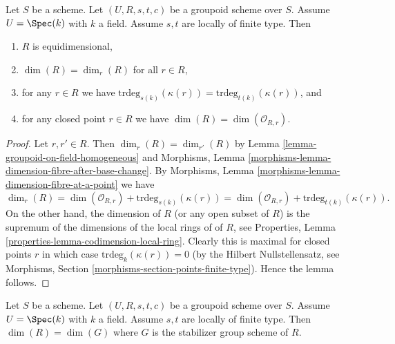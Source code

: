 \begin{lemma}
\label{lemma-groupoid-on-field-locally-finite-type-dimension}
Let $S$ be a scheme. Let $(U, R, s, t, c)$ be a groupoid scheme
over $S$. Assume $U = \Spec(k)$ with $k$ a field.
Assume $s, t$ are locally of finite type.
Then
\begin{enumerate}
\item $R$ is equidimensional,
\item $\dim(R) = \dim_r(R)$ for all $r \in R$,
\item for any $r \in R$ we have
$\text{trdeg}_{s(k)}(\kappa(r)) = \text{trdeg}_{t(k)}(\kappa(r))$, and
\item for any closed point $r \in R$ we have
$\dim(R) = \dim(\mathcal{O}_{R, r})$.
\end{enumerate}
\end{lemma}

\begin{proof}
Let $r, r' \in R$.
Then $\dim_r(R) = \dim_{r'}(R)$ by
Lemma \ref{lemma-groupoid-on-field-homogeneous}
and
Morphisms, Lemma \ref{morphisms-lemma-dimension-fibre-after-base-change}.
By
Morphisms, Lemma \ref{morphisms-lemma-dimension-fibre-at-a-point}
we have
$$
\dim_r(R) =
\dim(\mathcal{O}_{R, r}) + \text{trdeg}_{s(k)}(\kappa(r)) =
\dim(\mathcal{O}_{R, r}) + \text{trdeg}_{t(k)}(\kappa(r)).
$$
On the other hand, the dimension of $R$ (or any open subset of $R$)
is the supremum of the dimensions of the local rings of of $R$, see
Properties, Lemma \ref{properties-lemma-codimension-local-ring}.
Clearly this is maximal for closed points $r$ in which case
$\text{trdeg}_k(\kappa(r)) = 0$ (by the Hilbert Nullstellensatz, see
Morphisms, Section \ref{morphisms-section-points-finite-type}).
Hence the lemma follows.
\end{proof}

\begin{lemma}
\label{lemma-groupoid-on-field-dimension-equal-stabilizer}
Let $S$ be a scheme. Let $(U, R, s, t, c)$ be a groupoid scheme
over $S$. Assume $U = \Spec(k)$ with $k$ a field.
Assume $s, t$ are locally of finite type.
Then $\dim(R) = \dim(G)$ where $G$ is the stabilizer group scheme of $R$.
\end{lemma}

